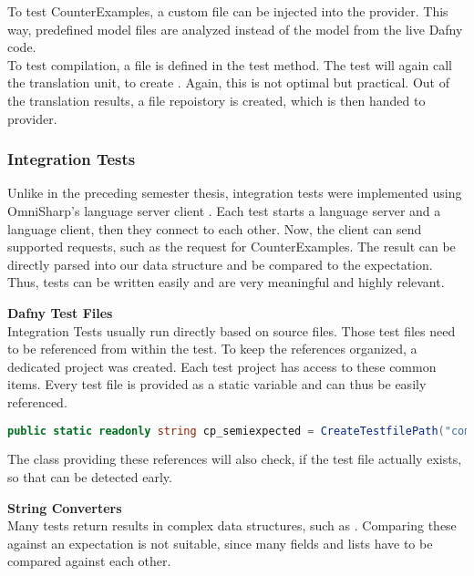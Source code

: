 To test CounterExamples, a custom  file can be injected into the provider.
This way, predefined model files are analyzed instead of the model from the live Dafny code.\\

To test compilation, a  file is defined in the test method.
The test will again call the translation unit, to create .
Again, this is not optimal but practical.
Out of the translation results, a file repoistory is created, which is then handed to provider.



\subsubsection{Integration Tests}

Unlike in the preceding semester thesis, integration tests were implemented using OmniSharp's language server client \cite{omnisharpClient}.
Each test starts a language server and a language client, then they connect to each other.
Now, the client can send supported requests, such as the request for CounterExamples.
The result can be directly parsed into our  data structure and be compared to the expectation.
Thus, tests can be written easily and are very meaningful and highly relevant.

\textbf{Dafny Test Files}\\
Integration Tests usually run directly based on  source files.
Those test files need to be referenced from within the test.
To keep the references organized, a dedicated project  was created.
Each test project has access to these common items.
Every test file is provided as a static variable and can thus be easily referenced.

\begin{lstlisting}[language=csharp, caption={Test File Reference}, captionpos=b, label={lst:semiExpectedCodeThing}]
public static readonly string cp_semiexpected = CreateTestfilePath("compile/semi_expected_error.dfy");
\end{lstlisting}
The class providing these references will also check, if the test file actually exists, so that  can be detected early.

\textbf{String Converters}\\
Many tests return results in complex data structures, such as .
Comparing these against an expectation is not suitable, since many fields and lists have to be compared against each other.\\


